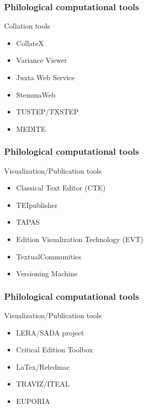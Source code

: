 \begin{frame}
	\frametitle{Philological computational tools}
	\addtocounter{nframe}{1}
    \begin{block}{Collation tools}
		\begin{itemize}
			\item CollateX
			\item Variance Viewer
			\item Juxta Web Service
			\item StemmaWeb
			\item TUSTEP/TXSTEP
			\item MEDITE
		\end{itemize}
	\end{block}
\end{frame}

\begin{frame}
	\frametitle{Philological computational tools}
	\addtocounter{nframe}{1}
    \begin{block}{Visualization/Publication tools}
		\begin{itemize}
			\item Classical Text Editor (CTE)
			\item TEIpublisher
			\item TAPAS
			\item Edition Visualization Technology (EVT)
			\item TextualCommunities
			\item Versioning Machine
		\end{itemize}
	\end{block}
\end{frame}

\begin{frame}
	\frametitle{Philological computational tools}
	\addtocounter{nframe}{1}
    \begin{block}{Visualization/Publication tools}
		\begin{itemize}
			\item LERA/SADA project
			\item Critical Edition Toolbox
			\item LaTex/Reledmac
			\item TRAVIZ/ITEAL
			\item EUPORIA
		\end{itemize}
	\end{block}
\end{frame}



